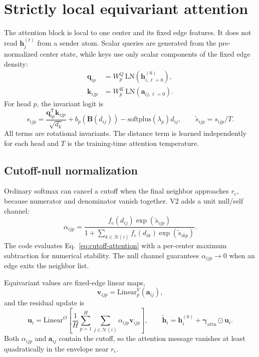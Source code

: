 \documentclass[10pt]{article}
\newcommand{\calN}{\mathcal{N}}
\newcommand{\vect}[1]{\bm{#1}}
\begin{document}
\section{Strictly local equivariant attention}

The attention block is local to one center and its fixed edge features. It does
not read $\vect h_j^{(t)}$ from a sender atom. Scalar queries are generated from
the pre-normalized center state, while keys use only scalar components of the
fixed edge density:
\begin{align}
 \vect q_{ip} &= W^Q_p\,\mathrm{LN}(\vect h^{(0)}_{i,\ell=0}),\\
 \vect k_{ijp} &= W^K_p\,\mathrm{LN}(\vect a_{ij,\ell=0}).
\end{align}
For head $p$, the invariant logit is
\begin{equation}
 s_{ijp}=\frac{\vect q_{ip}^{\mathsf T}\vect k_{ijp}}{\sqrt{d_k}}
 +b_p(\vect B(d_{ij}))
 -\mathrm{softplus}(\lambda_p)d_{ij},
 \qquad \widetilde s_{ijp}=s_{ijp}/T.
 \label{eq:logit}
\end{equation}
All terms are rotational invariants. The distance term is learned independently
for each head and $T$ is the training-time attention temperature.

\subsection{Cutoff-null normalization}

Ordinary softmax can cancel a cutoff when the final neighbor approaches
$r_{\mathrm c}$, because numerator and denominator vanish together. V2 adds a
unit null/self channel:
\begin{equation}
 \alpha_{ijp}=
 \frac{f_{\mathrm c}(d_{ij})\exp(\widetilde s_{ijp})}
 {1+\sum_{k\in\calN(i)}f_{\mathrm c}(d_{ik})
 \exp(\widetilde s_{ikp})}.
 \label{eq:cutoff-attention}
\end{equation}
The code evaluates Eq.~\eqref{eq:cutoff-attention} with a per-center maximum
subtraction for numerical stability. The null channel guarantees
$\alpha_{ijp}\rightarrow0$ when an edge exits the neighbor list.

Equivariant values are fixed-edge linear maps,
\begin{equation}
 \vect v_{ijp}=\mathrm{Linear}^{V}_p(\vect a_{ij}),
\end{equation}
and the residual update is
\begin{equation}
 \vect u_i=\mathrm{Linear}^{O}\!\left[
 \frac{1}{H}\sum_{p=1}^{H}\sum_{j\in\calN(i)}
 \alpha_{ijp}\vect v_{ijp}\right],
 \qquad
 \widetilde{\vect h}_i=\vect h_i^{(0)}+\vect\gamma_{\mathrm{attn}}\odot\vect u_i.
 \label{eq:attention-update}
\end{equation}
Both $\alpha_{ijp}$ and $\vect a_{ij}$ contain the cutoff, so the attention
message vanishes at least quadratically in the envelope near $r_{\mathrm c}$.
\end{document}
